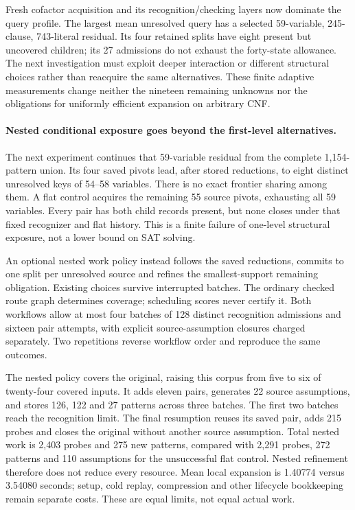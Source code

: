 \documentclass[11pt,a4paper]{article}
\numberwithin{equation}{section}
\theoremstyle{plain}
\theoremstyle{definition}
\theoremstyle{remark}
\begin{document}
Fresh cofactor acquisition and its recognition/checking layers now dominate the
query profile. The largest mean unresolved query has a selected 59-variable,
245-clause, 743-literal residual. Its four retained splits have eight present but
uncovered children; its 27 admissions do not exhaust the forty-state allowance.
The next investigation must exploit deeper interaction or different structural
choices rather than reacquire the same alternatives. These finite adaptive
measurements change neither the nineteen remaining unknowns nor the obligations
for uniformly efficient expansion on arbitrary CNF.

\paragraph{Nested conditional exposure goes beyond the first-level alternatives.}
The next experiment continues that 59-variable residual from the complete
1,154-pattern union. Its four saved pivots lead, after stored reductions, to eight
distinct unresolved keys of 54--58 variables. There is no exact frontier sharing
among them. A flat control acquires the remaining 55 source pivots, exhausting
all 59 variables. Every pair has both child records present, but none closes under
that fixed recognizer and flat history. This is a finite failure of one-level
structural exposure, not a lower bound on SAT solving.

An optional nested work policy instead follows the saved reductions, commits to
one split per unresolved source and refines the smallest-support remaining
obligation. Existing choices survive interrupted batches. The ordinary checked
route graph determines coverage; scheduling scores never certify it. Both
workflows allow at most four batches of 128 distinct recognition admissions and
sixteen pair attempts, with explicit source-assumption closures charged separately.
Two repetitions reverse workflow order and reproduce the same outcomes.

The nested policy covers the original, raising this corpus from five to six of
twenty-four covered inputs. It adds eleven pairs, generates 22 source assumptions,
and stores 126, 122 and 27 patterns across three batches. The first two batches
reach the recognition limit. The final resumption reuses its saved pair, adds
215 probes and closes the original without another source assumption. Total
nested work is 2,403 probes and 275 new patterns, compared with 2,291 probes,
272 patterns and 110 assumptions for the unsuccessful flat control. Nested
refinement therefore does not reduce every resource. Mean local expansion is
1.40774 versus 3.54080 seconds; setup, cold replay, compression and other lifecycle
bookkeeping remain separate costs. These are equal limits, not equal actual work.
\end{document}
